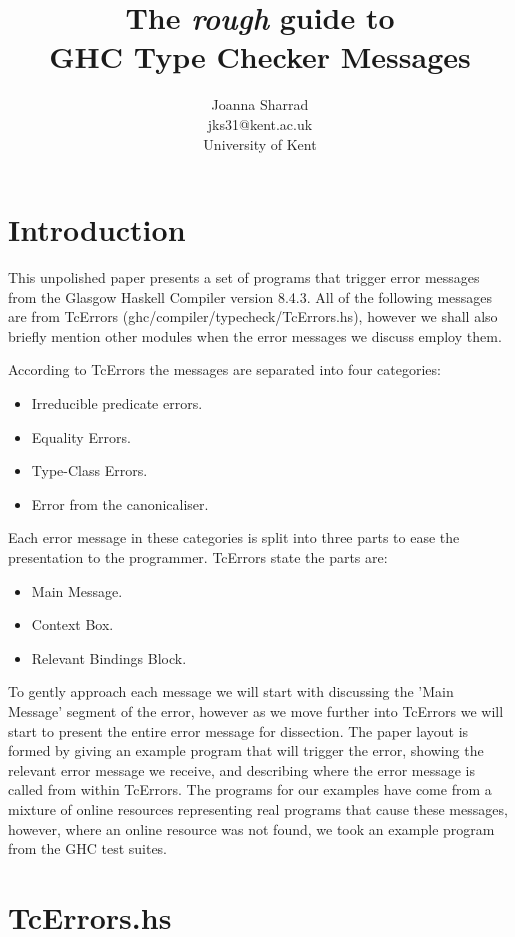 \documentclass[a4paper]{article}
\title{The \textit{\textbf{rough}} guide to \\GHC Type Checker Messages}
\author{Joanna Sharrad \\ \small jks31@kent.ac.uk \\ \small University of Kent}
\date{}
\begin{document}
\maketitle

\section{Introduction}

This unpolished paper presents a set of programs that trigger error messages from the Glasgow Haskell Compiler version 8.4.3. All of the following messages are from TcErrors (ghc/compiler/typecheck/TcErrors.hs), however we shall also briefly mention other modules when the error messages we discuss employ them. 

According to TcErrors the messages are separated into four categories:

\begin{itemize}
\item Irreducible predicate errors.
\item Equality Errors.
\item Type-Class Errors.
\item Error from the canonicaliser.
\end{itemize}

Each error message in these categories is split into three parts to ease the presentation to the programmer. TcErrors state the parts are:

\begin{itemize}
\item Main Message.
\item Context Box.
\item Relevant Bindings Block.
\end{itemize}

To gently approach each message we will start with discussing the 'Main Message' segment of the error, however as we move further into TcErrors we will start to present the entire error message for dissection. The paper layout is formed by giving an example program that will trigger the error, showing the relevant error message we receive, and describing where the error message is called from within TcErrors. The programs for our examples have come from a mixture of online resources representing real programs that cause these messages, however, where an online resource was not found, we took an example program from the GHC test suites. 

\section{TcErrors.hs}
\end{document}
